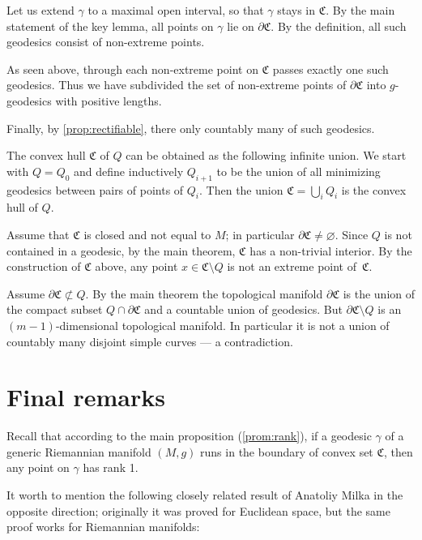 \documentclass[a4paper,10pt]{article}
\begin{document}
Let us extend $\gamma$ to a maximal open interval, so that $\gamma$ stays in $\mathfrak C$.
By the main statement of the key lemma, all points on $\gamma$ lie on $\partial \mathfrak C$.
By the definition, all such geodesics consist of non-extreme points.

As seen above, through each non-extreme point on $\mathfrak C$ passes exactly one such geodesics.
Thus we have subdivided the set of non-extreme points of $\partial\mathfrak C$ into $g$-geodesics with positive lengths.

Finally, by \ref{prop:rectifiable}, there only countably many of such geodesics.
\qeds

The convex hull $\mathfrak{C}$ of $Q$ can be obtained as the following infinite union.
We start with $Q=Q_0$ and define inductively $Q_{i+1}$ to be the union of all minimizing geodesics between pairs of points of $Q_i$.
Then the union $\mathfrak{C}= \bigcup_{i} 
Q_i$ is the convex hull of $Q$.

Assume that $\mathfrak{C}$ is closed and not equal to $M$; in particular $\partial\mathfrak{C}\ne \varnothing$.
Since $Q$ is not contained in a geodesic, by the main theorem, $\mathfrak{C}$ has a non-trivial interior.
By the construction of $\mathfrak{C}$ above, any point $x\in \mathfrak{C} \setminus Q$ is not an extreme point of~$\mathfrak{C}$.

Assume $\partial \mathfrak{C} \not\subset Q$.
By the main theorem the topological manifold $\partial \mathfrak{C}$ is the union of the compact subset $Q\cap \partial \mathfrak{C}$ and a countable union of geodesics.
But $\partial \mathfrak{C} \setminus Q$ is an $(m-1)$-dimensional topological manifold.
In particular it is not a union of countably many disjoint simple curves --- a contradiction.
\qeds

\section{Final remarks}

Recall that according to the main proposition (\ref{prom:rank}), if a geodesic $\gamma$ of a generic Riemannian manifold $(M,g)$ runs in the boundary of convex set $\mathfrak{C}$, then any point on $\gamma$ has rank 1.

It worth to mention the following closely related result of Anatoliy Milka \cite[§~4]{milka} in the opposite direction; originally it was proved for Euclidean space, but the same proof works for Riemannian manifolds:
\end{document}
